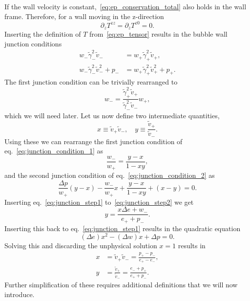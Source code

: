If the wall velocity is constant,~\eqref{eq:ep_conservation_total} also holds in the wall frame.
Therefore, for a wall moving in the z-direction
\cite[eq. 7]{espinosa_energy_2010}
\begin{equation}
\partial_z T^{zz} = \partial_z T^{z0} = 0.
\end{equation}
Inserting the definition of $T$ from~\eqref{eq:ep_tensor} results in the
bubble wall junction conditions
\cites[eq. 7.22]{lecture_notes}[eq. 135.2, 135.3]{landau_fluid_1987}
\begin{align}
w_- \tilde{\gamma}_-^2 \tilde{v}_- &= w_+ \tilde{\gamma}_+^2 \tilde{v}_+,
\label{eq:junction_condition_1} \\
w_- \tilde{\gamma}_-^2 \tilde{v}_-^2 + p_- &= w_+ \tilde{\gamma}_+^2 \tilde{v}_+^2 + p_+.
\label{eq:junction_condition_2}
\end{align}
The first junction condition can be trivially rearranged to
\begin{equation}
w_- = \frac{\tilde{\gamma}_+^2 \tilde{v}_+}{\tilde{\gamma}_-^2 \tilde{v}_-} w_+,
\label{eq:wm_junction}
\end{equation}
which we will need later.
Let us now define two intermediate quantities,
\begin{equation}
x \equiv \tilde{v}_+ \tilde{v}_-, \quad y \equiv \frac{\tilde{v}_+}{\tilde{v}_-}.
\end{equation}
Using these we can rearrange the first junction condition of eq.~\eqref{eq:junction_condition_1} as
\begin{equation}
\frac{w_-}{w_+} = \frac{y-x}{1-xy},
\label{eq:junction_step1}
\end{equation}
and the second junction condition of eq.~\eqref{eq:junction_condition_2} as
\begin{equation}
\frac{\Delta p}{w_+} (y-x) - \frac{w_-}{w_+} x + \frac{y-x}{1-xy} + (x-y) = 0.
\label{eq:junction_step2}
\end{equation}
Inserting eq.~\eqref{eq:junction_step1} to~\eqref{eq:junction_step2} we get
\begin{equation}
y = \frac{x \Delta e + w_-}{e_+ + p_-}.
\end{equation}
Inserting this back to eq.~\eqref{eq:junction_step1} results in the quadratic equation
\begin{equation}
(\Delta e) x^2 - (\Delta w) x + \Delta p = 0.
\end{equation}
Solving this and discarding the unphysical solution $x = 1$ results in
\cites[eq. 7.32]{lecture_notes}[eq. 4.134]{rezzolla_relativistic_2013}
\begin{align}
x &= \tilde{v}_+ \tilde{v}_- = \frac{p_+ - p_-}{e_+ - e_-}, \\
y &= \frac{\tilde{v}_+}{\tilde{v}_-} = \frac{e_- + p_+}{e_+ + p_-}.
\label{eq:junction_ep}
\end{align}
Further simplification of these requires additional definitions
that we will now introduce.

